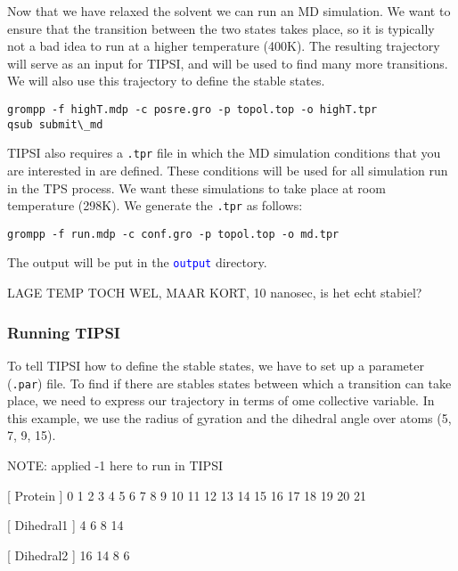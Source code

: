 \documentclass[]{article}
\begin{document}
Now that we have relaxed the solvent we can run an MD simulation. We want to ensure that the transition between the two states takes place, so it is typically not a bad idea to run at a higher temperature (400K). The resulting trajectory will serve as an input for \textsc{TIPSI}, and will be used to find many more transitions. We will also use this trajectory to define the stable states.
%
\begin{lstlisting}
grompp -f highT.mdp -c posre.gro -p topol.top -o highT.tpr
qsub submit\_md
\end{lstlisting}
%
\textsc{TIPSI} also requires a \texttt{.tpr} file in which the MD simulation conditions that you are interested in are defined. These conditions will be used for all simulation run in the TPS process. We want these simulations to take place at room temperature (298K). We generate the \texttt{.tpr} as follows:
%
\begin{lstlisting}
grompp -f run.mdp -c conf.gro -p topol.top -o md.tpr
\end{lstlisting}
%
The output will be put in the \texttt{\textcolor{blue}{output}} directory.

LAGE TEMP TOCH WEL, MAAR KORT, 10 nanosec, is het echt stabiel?

\subsubsection*{Running TIPSI}


To tell \textsc{TIPSI} how to define the stable states, we have to set up a parameter (\texttt{.par}) file. To find if there are stables states between which a transition can take place, we need to express our trajectory in terms of ome collective variable. In this example, we use the radius of gyration and the dihedral angle over atoms (5, 7, 9, 15).

NOTE: applied -1 here to run in TIPSI

[ Protein ]
  0    1    2    3    4    5    6    7    8    9   10   11   12   13   14   15
  16   17   18   19   20   21  

[ Dihedral1 ]
   4    6    8   14

[ Dihedral2 ]
   16   14   8   6
\end{document}
